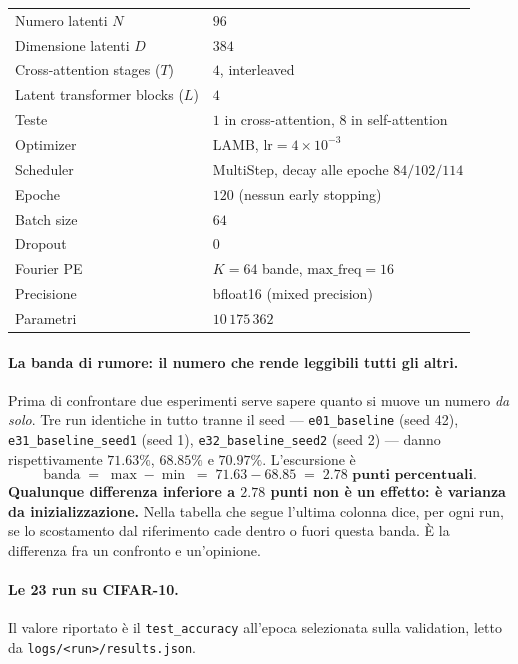\documentclass[
  11pt,
]{article}
\begin{document}
\begin{center}
{\small
\begin{tabular}{@{}ll@{}}
\toprule
Numero latenti $N$ & $96$ \\
Dimensione latenti $D$ & $384$ \\
Cross-attention stages ($T$) & $4$, interleaved \\
Latent transformer blocks ($L$) & $4$ \\
Teste & $1$ in cross-attention, $8$ in self-attention \\
Optimizer & LAMB, $\text{lr} = 4 \times 10^{-3}$ \\
Scheduler & MultiStep, decay alle epoche $84 / 102 / 114$ \\
Epoche & $120$ (nessun early stopping) \\
Batch size & $64$ \\
Dropout & $0$ \\
Fourier PE & $K=64$ bande, $\text{max\_freq}=16$ \\
Precisione & bfloat16 (mixed precision) \\
Parametri & $10\,175\,362$ \\
\bottomrule
\end{tabular}
}
\end{center}

\paragraph{La banda di rumore: il numero che rende leggibili tutti gli altri.}
Prima di confrontare due esperimenti serve sapere quanto si muove un numero \emph{da solo}. Tre run identiche in tutto tranne il seed --- \texttt{e01\_baseline} (seed 42), \texttt{e31\_baseline\_seed1} (seed 1), \texttt{e32\_baseline\_seed2} (seed 2) --- danno rispettivamente $71.63\%$, $68.85\%$ e $70.97\%$. L'escursione è
\[
  \text{banda} \;=\; \max - \min \;=\; 71.63 - 68.85 \;=\; \mathbf{2.78 \text{ punti percentuali}}.
\]
\textbf{Qualunque differenza inferiore a $2.78$ punti non è un effetto: è varianza da inizializzazione.} Nella tabella che segue l'ultima colonna dice, per ogni run, se lo scostamento dal riferimento cade dentro o fuori questa banda. È la differenza fra un confronto e un'opinione.

\paragraph{Le 23 run su CIFAR-10.} Il valore riportato è il \texttt{test\_accuracy} all'epoca selezionata sulla validation, letto da \texttt{logs/<run>/results.json}.
\end{document}

